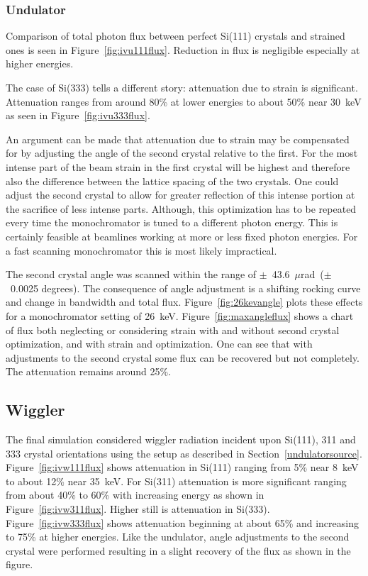 \documentclass{iucr}
\begin{document}
\subsubsection{Undulator}
Comparison of total photon flux between perfect Si(111) crystals and strained ones is seen in Figure~\ref{fig:ivu111flux}. Reduction in flux is negligible especially at higher energies.

The case of Si(333) tells a different story: attenuation due to strain is significant. Attenuation ranges from around 80\% at lower energies to about 50\% near 30~keV as seen in Figure~\ref{fig:ivu333flux}.

An argument can be made that attenuation due to strain may be compensated for by adjusting the angle of the second crystal relative to the first. For the most intense part of the beam strain in the first crystal will be highest and therefore also the difference between the lattice spacing of the two crystals. One could adjust the second crystal to allow for greater reflection of this intense portion at the sacrifice of less intense parts. Although, this optimization has to be repeated every time the monochromator is tuned to a different photon energy. This is certainly feasible at beamlines working at more or less fixed photon energies. For a fast scanning monochromator this is most likely impractical.

The second crystal angle was scanned within the range of $\pm$~43.6~$\mu$rad~($\pm$~0.0025 degrees). The consequence of angle adjustment is a shifting rocking curve and change in bandwidth and total flux. Figure~\ref{fig:26kevangle} plots these effects for a monochromator setting of 26~keV. Figure~\ref{fig:maxangleflux} shows a chart of flux both neglecting or considering strain with and without second crystal optimization, and with strain and optimization. One can see that with adjustments to the second crystal some flux can be recovered but not completely. The attenuation remains around 25\%.

\subsection{Wiggler}
The final simulation considered wiggler radiation incident upon Si(111), 311 and 333 crystal orientations using the setup as described in Section~\ref{undulatorsource}. Figure~\ref{fig:ivw111flux} shows attenuation in Si(111) ranging from 5\% near 8~keV to about 12\% near 35~keV. For Si(311) attenuation is more significant ranging from about 40\% to 60\% with increasing energy as shown in Figure~\ref{fig:ivw311flux}. Higher still is attenuation in Si(333). Figure~\ref{fig:ivw333flux} shows attenuation beginning at about 65\% and increasing to 75\% at higher energies. Like the undulator, angle adjustments to the second crystal were performed resulting in a slight recovery of the flux as shown in the figure.
\end{document}
